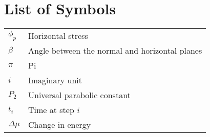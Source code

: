 \chapter*{List of Symbols} \label{symbols}

\begin{tabular}{@{}L{1in} L{4.5in}}
$\phi_p$ & Horizontal stress \\
$\beta$ & Angle between the normal and horizontal planes \\
$\pi$ & Pi \\
$i$ & Imaginary unit \\
$P_2$ & Universal parabolic constant \\
$t_i$ & Time at step $i$ \\
$\Delta\mu$ & Change in energy \\
\end{tabular}

